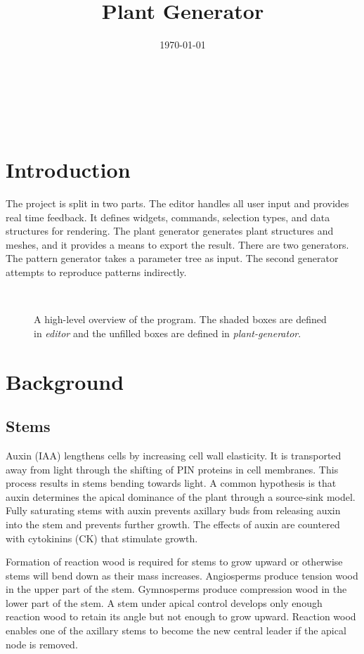 \documentclass[10pt]{article}
\title{Plant Generator}
\date{\today}
\begin{document}
\begin{center}
  \\
 \vspace{1em}
 \begin{huge} \@title \end{huge} \\
 \vspace{1em}
 \@date
\end{center}
\tableofcontents
\pagebreak

\section{Introduction}
The project is split in two parts. The editor handles all user input and provides real time feedback. It defines widgets, commands, selection types, and data structures for rendering. The plant generator generates plant structures and meshes, and it provides a means to export the result. There are two generators. The pattern generator takes a parameter tree as input. The second generator attempts to reproduce patterns indirectly.
\begin{figure}[H]
\centering
 \\
\caption{A high-level overview of the program. The shaded boxes are defined in \textit{editor} and the unfilled boxes are defined in \textit{plant-generator}.}
\end{figure}

\section{Background}
\subsection{Stems}
Auxin (IAA) lengthens cells by increasing cell wall elasticity. It is transported away from light through the shifting of PIN proteins in cell membranes. This process results in stems bending towards light. A common hypothesis is that auxin determines the apical dominance of the plant through a source-sink model. Fully saturating stems with auxin prevents axillary buds from releasing auxin into the stem and prevents further growth. The effects of auxin are countered with cytokinins (CK) that stimulate growth.

Formation of reaction wood is required for stems to grow upward or otherwise stems will bend down as their mass increases. Angiosperms produce tension wood in the upper part of the stem. Gymnosperms produce compression wood in the lower part of the stem. A stem under apical control develops only enough reaction wood to retain its angle but not enough to grow upward. Reaction wood enables one of the axillary stems to become the new central leader if the apical node is removed.
\end{document}
